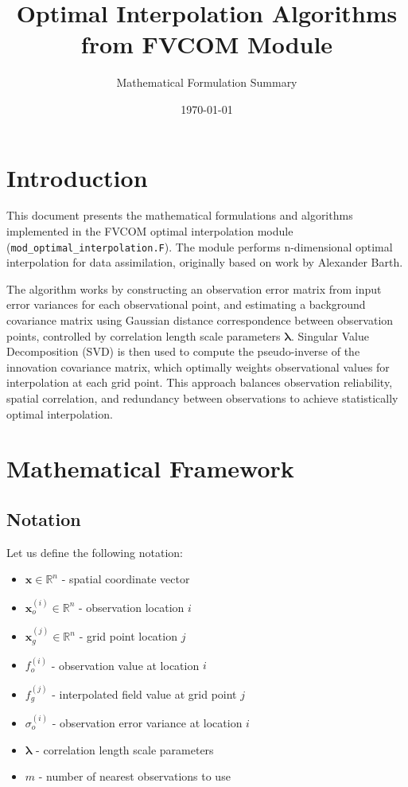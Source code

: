 \documentclass[11pt]{article}
\title{Optimal Interpolation Algorithms from FVCOM Module}
\author{Mathematical Formulation Summary}
\date{\today}
\begin{document}
\maketitle

\section{Introduction}

This document presents the mathematical formulations and algorithms implemented in the FVCOM optimal interpolation module (\texttt{mod\_optimal\_interpolation.F}). The module performs n-dimensional optimal interpolation for data assimilation, originally based on work by Alexander Barth.

The algorithm works by constructing an observation error matrix from input error variances for each observational point, and estimating a background covariance matrix using Gaussian distance correspondence between observation points, controlled by correlation length scale parameters $\boldsymbol{\lambda}$. Singular Value Decomposition (SVD) is then used to compute the pseudo-inverse of the innovation covariance matrix, which optimally weights observational values for interpolation at each grid point. This approach balances observation reliability, spatial correlation, and redundancy between observations to achieve statistically optimal interpolation.

\section{Mathematical Framework}

\subsection{Notation}

Let us define the following notation:
\begin{itemize}
    \item $\mathbf{x} \in \mathbb{R}^n$ - spatial coordinate vector
    \item $\mathbf{x}_o^{(i)} \in \mathbb{R}^n$ - observation location $i$
    \item $\mathbf{x}_g^{(j)} \in \mathbb{R}^n$ - grid point location $j$
    \item $f_o^{(i)}$ - observation value at location $i$
    \item $f_g^{(j)}$ - interpolated field value at grid point $j$
    \item $\sigma_o^{(i)}$ - observation error variance at location $i$
    \item $\boldsymbol{\lambda}$ - correlation length scale parameters
    \item $m$ - number of nearest observations to use
\end{itemize}
\end{document}
